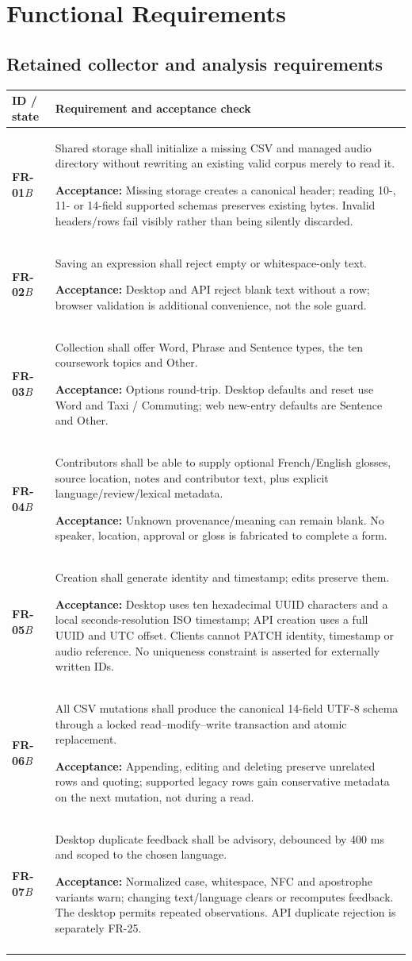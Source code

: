 \documentclass[11pt,a4paper]{article}
\newcommand{\requirement}[4]{\textbf{#1}\newline\textit{#2} & #3\par\smallskip\textbf{Acceptance:} #4\\\addlinespace}
\begin{document}
\section{Functional Requirements}
\subsection{Retained collector and analysis requirements}
\begin{longtable}{L{1.8cm}L{12.5cm}}
\toprule\textbf{ID / state} & \textbf{Requirement and acceptance check}\\\midrule\endhead
\requirement{FR-01}{B}
{Shared storage shall initialize a missing CSV and managed audio directory without rewriting an existing valid corpus merely to read it.}
{Missing storage creates a canonical header; reading 10-, 11- or 14-field supported schemas preserves existing bytes. Invalid headers/rows fail visibly rather than being silently discarded.}
\requirement{FR-02}{B}
{Saving an expression shall reject empty or whitespace-only text.}
{Desktop and API reject blank text without a row; browser validation is additional convenience, not the sole guard.}
\requirement{FR-03}{B}
{Collection shall offer Word, Phrase and Sentence types, the ten coursework topics and Other.}
{Options round-trip. Desktop defaults and reset use Word and Taxi / Commuting; web new-entry defaults are Sentence and Other.}
\requirement{FR-04}{B}
{Contributors shall be able to supply optional French/English glosses, source location, notes and contributor text, plus explicit language/review/lexical metadata.}
{Unknown provenance/meaning can remain blank. No speaker, location, approval or gloss is fabricated to complete a form.}
\requirement{FR-05}{B}
{Creation shall generate identity and timestamp; edits preserve them.}
{Desktop uses ten hexadecimal UUID characters and a local seconds-resolution ISO timestamp; API creation uses a full UUID and UTC offset. Clients cannot PATCH identity, timestamp or audio reference. No uniqueness constraint is asserted for externally written IDs.}
\requirement{FR-06}{B}
{All CSV mutations shall produce the canonical 14-field UTF-8 schema through a locked read--modify--write transaction and atomic replacement.}
{Appending, editing and deleting preserve unrelated rows and quoting; supported legacy rows gain conservative metadata on the next mutation, not during a read.}
\requirement{FR-07}{B}
{Desktop duplicate feedback shall be advisory, debounced by 400 ms and scoped to the chosen language.}
{Normalized case, whitespace, NFC and apostrophe variants warn; changing text/language clears or recomputes feedback. The desktop permits repeated observations. API duplicate rejection is separately FR-25.}

\end{longtable}
\end{document}
